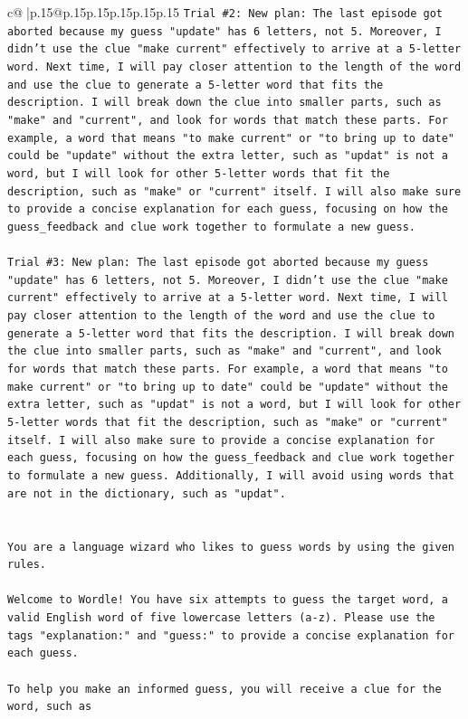 \documentclass{article}
\begin{document}
{\begin{supertabular}{c@{$\;$}|p{.15\linewidth}@{}p{.15\linewidth}p{.15\linewidth}p{.15\linewidth}p{.15\linewidth}p{.15\linewidth}}
{{{\texttt{Trial \#2: New plan: The last episode got aborted because my guess "update" has 6 letters, not 5. Moreover, I didn't use the clue "make current" effectively to arrive at a 5{-}letter word. Next time, I will pay closer attention to the length of the word and use the clue to generate a 5{-}letter word that fits the description. I will break down the clue into smaller parts, such as "make" and "current", and look for words that match these parts. For example, a word that means "to make current" or "to bring up to date" could be "update" without the extra letter, such as "updat" is not a word, but I will look for other 5{-}letter words that fit the description, such as "make" or "current" itself. I will also make sure to provide a concise explanation for each guess, focusing on how the guess\_feedback and clue work together to formulate a new guess.} \\
\\ 
\texttt{Trial \#3: New plan: The last episode got aborted because my guess "update" has 6 letters, not 5. Moreover, I didn't use the clue "make current" effectively to arrive at a 5{-}letter word. Next time, I will pay closer attention to the length of the word and use the clue to generate a 5{-}letter word that fits the description. I will break down the clue into smaller parts, such as "make" and "current", and look for words that match these parts. For example, a word that means "to make current" or "to bring up to date" could be "update" without the extra letter, such as "updat" is not a word, but I will look for other 5{-}letter words that fit the description, such as "make" or "current" itself. I will also make sure to provide a concise explanation for each guess, focusing on how the guess\_feedback and clue work together to formulate a new guess. Additionally, I will avoid using words that are not in the dictionary, such as "updat".} \\
\\ 
\\ 
\texttt{You are a language wizard who likes to guess words by using the given rules.} \\
\\ 
\texttt{Welcome to Wordle! You have six attempts to guess the target word, a valid English word of five lowercase letters (a{-}z). Please use the tags "explanation:" and "guess:" to provide a concise explanation for each guess.} \\
\\ 
\texttt{To help you make an informed guess, you will receive a clue for the word, such as} \\
}}}
\end{supertabular}}
\end{document}
